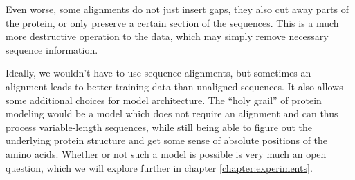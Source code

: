 Even worse, some alignments do not just insert gaps, they also cut away parts of the protein, or only preserve a certain section of the sequences. This is a much more destructive operation to the data, which may simply remove necessary sequence information.

Ideally, we wouldn't have to use sequence alignments, but sometimes an alignment leads to better training data than unaligned sequences. It also allows some additional choices for model architecture. The ``holy grail'' of protein modeling would be a model which does not require an alignment and can thus process variable-length sequences, while still being able to figure out the underlying protein structure and get some sense of absolute positions of the amino acids. Whether or not such a model is possible is very much an open question, which we will explore further in chapter \ref{chapter:experiments}. 


